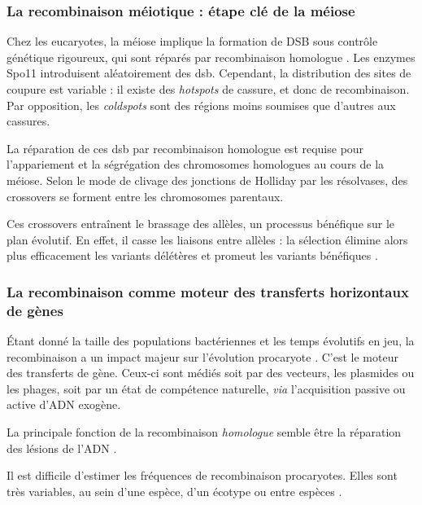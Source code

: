 \documentclass[11pt, oneside]{scrartcl}
\begin{document}
\subsubsection{La recombinaison méiotique : étape clé de la méiose}
\label{sec:orgheadline4}

Chez les eucaryotes, la méiose implique la formation de DSB sous contrôle
génétique rigoureux, qui sont réparés par recombinaison homologue
\cite{chapman_playing_2012}. Les enzymes Spo11 introduisent aléatoirement des
\ac{dsb}. Cependant, la distribution des sites de coupure est variable : il
existe des \emph{hotspots} de cassure, et donc de recombinaison. Par opposition, les
\emph{coldspots} sont des régions moins soumises que d'autres aux cassures.

La réparation de ces \ac{dsb} par recombinaison homologue est requise pour
l'appariement et la ségrégation des chromosomes homologues au cours de la
méiose. Selon le mode de clivage des jonctions de Holliday par les résolvases,
des crossovers se forment entre les chromosomes parentaux. 

Ces crossovers entraînent le brassage des allèles, un processus bénéfique sur le
plan évolutif\cite{webster_direct_2012}. En effet, il casse les liaisons entre
allèles : la sélection élimine alors plus efficacement les variants délétères et
promeut les variants bénéfiques \cite{otto_resolving_2002}. 

\subsubsection{La recombinaison comme moteur des transferts horizontaux de gènes}
\label{sec:orgheadline5}

Étant donné la taille des populations bactériennes et les temps évolutifs en
jeu, la recombinaison a un impact majeur sur l'évolution procaryote
\cite{didelot_impact_2010}. C'est le moteur des transferts de gène. Ceux-ci sont
médiés soit par des vecteurs, les plasmides ou les phages, soit par un état de
compétence naturelle, \emph{via} l'acquisition passive ou active d'ADN exogène. 

La principale fonction de la recombinaison \emph{homologue} semble être la réparation
des lésions de l'ADN \cite{fall_horizontal_2007}. 

Il est difficile d'estimer les fréquences de recombinaison procaryotes. Elles
sont très variables, au sein d'une espèce, d'un écotype ou entre espèces
\cite{didelot_impact_2010}.

\end{document}

